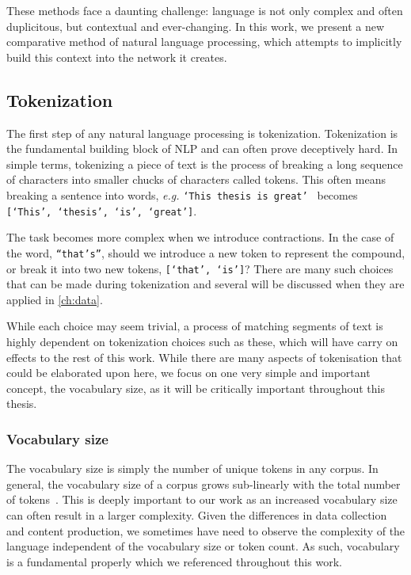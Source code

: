 These methods face a daunting challenge: language is not only complex and often duplicitous, but contextual and ever-changing. In this work, we present a new comparative method of natural language processing, which attempts to implicitly build this context into the network it creates.

\subsection{Tokenization}\label{sec:tokenization}
The first step of any natural language processing is tokenization. Tokenization is the fundamental building block of NLP and can often prove deceptively hard. In simple terms, tokenizing a piece of text is the process of breaking a long sequence of characters into smaller chucks of characters called tokens. This often means breaking a sentence into words, \emph{e.g.} \texttt{`This thesis is great' } becomes \texttt{[`This', `thesis', `is',  `great']}.

The task becomes more complex when we introduce contractions. In the case of the word, \texttt{``that's''}, should we introduce a new token to represent the compound, or break it into two new tokens, \texttt{[`that', `is']}? There are many such choices that can be made during tokenization and several will be discussed when they are applied in \autoref{ch:data}.

While each choice may seem trivial, a process of matching segments of text is highly dependent on tokenization choices such as these, which will have carry on effects to the rest of this work. While there are many aspects of tokenisation that could be elaborated upon here, we focus on one very simple and important concept, the vocabulary size, as it will be critically important throughout this thesis. 


\subsubsection{Vocabulary size}\label{sec:background_vocab_sizes}


The vocabulary size is simply the number of unique tokens in any corpus. In general, the vocabulary size of a corpus grows sub-linearly with the total number of tokens~\cite{heaps1978information}. This is deeply important to our work as an increased vocabulary size can often result in a larger complexity. Given the differences in data collection and content production, we sometimes have need to observe the complexity of the language independent of the vocabulary size or token count. As such, vocabulary is a fundamental properly which we referenced throughout this work.


